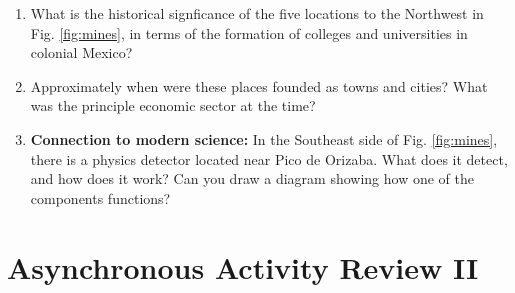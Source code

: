 \documentclass[10pt]{article}
\begin{document}
\begin{enumerate}
\item What is the historical signficance of the five locations to the Northwest in Fig. \ref{fig:mines}, in terms of the formation of colleges and universities in colonial Mexico? \\ \vspace{2cm}
\item Approximately when were these places founded as towns and cities?  What was the principle economic sector at the time? \\ \vspace{2cm}
\item \textbf{Connection to modern science:} In the Southeast side of Fig. \ref{fig:mines}, there is a physics detector located near Pico de Orizaba.  What does it detect, and how does it work? Can you draw a diagram showing how one of the components functions? \\ \vspace{2cm}
\end{enumerate}

\clearpage

\section{Asynchronous Activity Review II}
\end{document}

